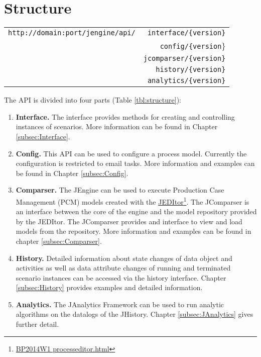 \documentclass[paper=a4]{scrartcl}
\begin{document}
\section{Structure}
    \begin{centering}
		\label{tbl:structure}
		\centering
		\begin{tabular}{r|r}
			\texttt{http://domain:port/jengine/api/}&\texttt{interface/\{version\}}\\
			&\texttt{config/\{version}\}\\
			&\texttt{jcomparser/\{version\}}\\
			&\texttt{history/\{version\}}\\
			&\texttt{analytics/\{version\}}
		\end{tabular}
	\end{centering}
	The API is divided into four parts (Table \ref{tbl:structure}):
	\begin{enumerate}
		\item \textbf{Interface.}
			  The interface provides methods for creating and controlling instances of scenarios.
			  More information can be found in Chapter \ref{subsec:Interface}.
		\item \textbf{Config.}
			  This API can be used to configure a process model.
			  Currently the configuration is restricted to email tasks.
			  More information and examples can be found in Chapter \ref{subsec:Config}.
		\item \textbf{Comparser.}
			  The JEngine can be used to execute Production Case Management (PCM) models created with the \href{BP2014W1 processeditor.html}{JEDItor}\footnote{\url{BP2014W1 processeditor.html}}.
			  The JComparser is an interface between the core of the engine and the model repository provided by the JEDItor.
			  The JComparser provides and interface to view and load models from the repository.
			  More information and examples can be found in chapter \ref{subsec:Comparser}.
		\item \textbf{History.}
			  Detailed information about state changes of data object and activities as well as data attribute changes of running and terminated scenario instances can be accessed via the history interface.
			  Chapter \ref{subsec:History} provides examples and detailed information.
	    \item \textbf{Analytics.}
			  The JAnalytics Framework can be used to run analytic algorithms on the datalogs of the JHistory.
Chapter \ref{subsec:JAnalytics} gives further detail.

	\end{enumerate}


%

	 
\end{document}
